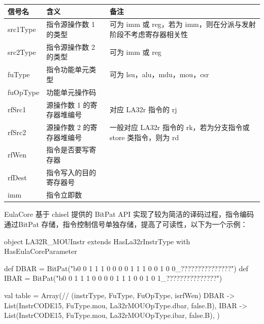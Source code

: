 \begin{longtable}[]{@{}
  >{\raggedright\arraybackslash}p{}
  >{\raggedright\arraybackslash}p{}
  >{\raggedright\arraybackslash}p{}@{}}
\toprule\noalign{}
\begin{minipage}[b]{\linewidth}\raggedright
信号名
\end{minipage} & \begin{minipage}[b]{\linewidth}\raggedright
含义
\end{minipage} & \begin{minipage}[b]{\linewidth}\raggedright
备注
\end{minipage} \\
\midrule\noalign{}
\endhead
\bottomrule\noalign{}
\endlastfoot
src1Type & 指令源操作数 1 的类型 & 可为 imm 或 reg，若为 imm，则在分派与发射阶段不考虑寄存器相关性 \\
src2Type & 指令源操作数 2 的类型 & 可为 imm 或 reg \\
fuType & 指令功能单元类型 & 可为 lsu，alu，mdu，mou，csr \\
fuOpType & 功能单元操作码 & \\
rfSrc1 & 源操作数 1 的寄存器堆编号 & 对应 LA32r 指令的 rj \\
rfSrc2 & 源操作数 2 的寄存器堆编号 & 一般对应 LA32r 指令的 rk，若为分支指令或 store 类指令，则为 rd \\
rfWen & 指令是否要写寄存器 & \\
rfDest & 指令写入的目的寄存器号 & \\
imm & 指令立即数 & \\
\end{longtable}

EulaCore 基于 chisel 提供的 BitPat API 实现了较为简洁的译码过程，指令编码通过BitPat 存储，指令控制信号单独存储，提高了可读性，以下为一个示例：

\begin{CodeBlock}[language=BookScala]
object LA32R_MOUInstr extends HasLa32rInstrType with HasEulaCoreParameter {

  def DBAR      = BitPat("b0 0 1 1 1 0 0 0 0 1 1 1 0 0 1 0 0_???????????????")
  def IBAR      = BitPat("b0 0 1 1 1 0 0 0 0 1 1 1 0 0 1 0 1_???????????????")

  val table = Array(// (instrType, FuType, FuOpType, isrfWen)
    DBAR      -> List(InstrCODE15, FuType.mou, La32rMOUOpType.dbar, false.B),
    IBAR      -> List(InstrCODE15, FuType.mou, La32rMOUOpType.ibar, false.B),
  )
}
\end{CodeBlock}

